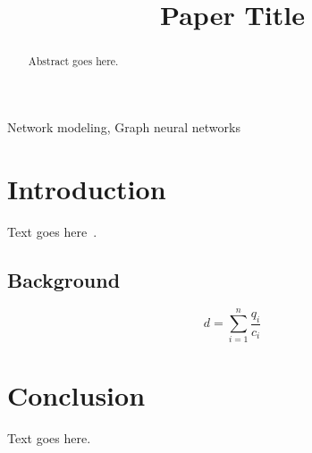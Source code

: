 \documentclass[conference,a4paper]{IEEEtran}
\begin{document}
\title{Paper Title}

\author{
}

\maketitle

\begin{abstract}
Abstract goes here.
\end{abstract}

\begin{IEEEkeywords}
Network modeling, Graph neural networks
\end{IEEEkeywords}

\section{Introduction}
Text goes here~\cite{sample2024}.

\subsection{Background}
\begin{equation}
d = \sum_{i=1}^{n} \frac{q_i}{c_i} \label{eq}
\end{equation}

\section{Conclusion}
Text goes here.



\end{document}
